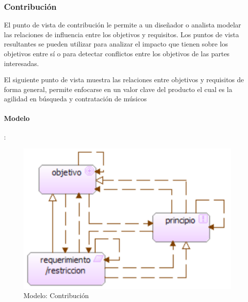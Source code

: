 \newpage

\subsubsection{Contribución}
El punto de vista de contribución le permite a un diseñador o analista modelar las relaciones de influencia entre los objetivos y requisitos. Los puntos de vista resultantes se pueden utilizar para analizar el impacto que tienen sobre los objetivos entre sí o para detectar conflictos entre los objetivos de las partes interesadas.
  \vspace{\baselineskip}

El siguiente punto de vista muestra las relaciones entre objetivos y requisitos de forma general, permite enfocarse en un valor clave del producto el cual es la agilidad en búsqueda y contratación de músicos

\paragraph{Modelo}:
\begin{figure}[h!]
	\centering
	\includegraphics[width=0.6\linewidth]{Desarrollo/ArquitecturaEmpresarial/Motivacion/imgs/ContribucionMetamodelo.PNG}
	\caption{Modelo: Contribución}
\end{figure}
\newpage
